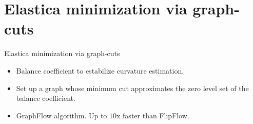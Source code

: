 \section{Elastica minimization via graph-cuts}

\begin{frame}
\center
\huge
Elastica minimization via graph-cuts

\vspace{2em}

\begin{minipage}{0.7\textwidth}
\normalsize
\begin{itemize}
\item{Balance coefficient to estabilize curvature estimation.}
\item{Set up a graph whose minimum cut approximates the zero level set of the balance coefficient.}
\item{GraphFlow algorithm. Up to $10$x faster than FlipFlow.}
\end{itemize}
\end{minipage}

\end{frame}

